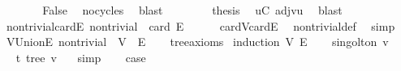 \begin{isabellebody}
\ \ \ \ \isamarkupfalse%
\ \isamarkupfalse%
\ False\ \isamarkupfalse%
\ no{\isacharunderscore}{\kern0pt}cycles\ \isamarkupfalse%
\ blast\isanewline
\ \ \isamarkupfalse%
\isanewline
\ \ \isamarkupfalse%
\ \isamarkupfalse%
\ {\isacharquery}{\kern0pt}thesis\ \isamarkupfalse%
\ {\isacartoucheopen}u{\isasymin}C{\isacartoucheclose}\ adj{\isacharunderscore}{\kern0pt}vu\ \isamarkupfalse%
\ blast\isanewline
{}\isamarkupfalse%
%
\endisatagproof
{\isafoldproof}%
%
\isadelimproof
\isanewline
%
\endisadelimproof
\isanewline
{}\isamarkupfalse%
\ non{\isacharunderscore}{\kern0pt}trivial{\isacharunderscore}{\kern0pt}card{\isacharunderscore}{\kern0pt}E{\isacharcolon}{\kern0pt}\ {\isachardoublequoteopen}non{\isacharunderscore}{\kern0pt}trivial\ {\isasymLongrightarrow}\ card\ E\ {\isasymge}\ {}{\isachardoublequoteclose}\isanewline
%
\isadelimproof
\ \ %
\endisadelimproof
%
\isatagproof
{}\isamarkupfalse%
\ card{\isacharunderscore}{\kern0pt}V{\isacharunderscore}{\kern0pt}card{\isacharunderscore}{\kern0pt}E\ \isamarkupfalse%
\ non{\isacharunderscore}{\kern0pt}trivial{\isacharunderscore}{\kern0pt}def\ \isamarkupfalse%
\ simp%
\endisatagproof
{\isafoldproof}%
%
\isadelimproof
\isanewline
%
\endisadelimproof
\isanewline
{}\isamarkupfalse%
\ V{\isacharunderscore}{\kern0pt}Union{\isacharunderscore}{\kern0pt}E{\isacharcolon}{\kern0pt}\ {\isachardoublequoteopen}non{\isacharunderscore}{\kern0pt}trivial\ {\isasymLongrightarrow}\ V\ {\isacharequal}{\kern0pt}\ {\isasymUnion}E{\isachardoublequoteclose}\isanewline
%
\isadelimproof
\ \ %
\endisadelimproof
%
\isatagproof
{}\isamarkupfalse%
\ tree{\isacharunderscore}{\kern0pt}axioms\isanewline
{}\isamarkupfalse%
\ {\isacharparenleft}{\kern0pt}induction\ V\ E{\isacharparenright}{\kern0pt}\isanewline
\ \ \isamarkupfalse%
\ {\isacharparenleft}{\kern0pt}singolton\ v{\isacharparenright}{\kern0pt}\ \isanewline
\ \ \isamarkupfalse%
\ \isamarkupfalse%
\ t{\isacharcolon}{\kern0pt}\ tree\ {\isachardoublequoteopen}{\isacharbraceleft}{\kern0pt}v{\isacharbraceright}{\kern0pt}{\isachardoublequoteclose}\ {\isachardoublequoteopen}{\isacharbraceleft}{\kern0pt}{\isacharbraceright}{\kern0pt}{\isachardoublequoteclose}\ \isamarkupfalse%
\ simp\isanewline
\ \ \isamarkupfalse%
\ {\isacharquery}{\kern0pt}case\ \isamarkupfalse%

\end{isabellebody}
